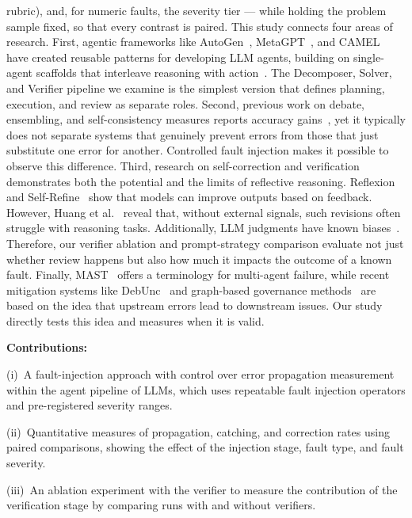 \documentclass[11pt]{article}
\begin{document}
rubric), and, for numeric faults, the severity tier --- while holding the problem sample
fixed, so that every contrast is paired.
This study connects four areas of research. First, agentic frameworks like AutoGen~\citep{wu2023autogen},
MetaGPT~\citep{hong2023metagpt}, and CAMEL~\citep{li2023camel} have created reusable patterns for
developing LLM agents, building on single-agent scaffolds that interleave reasoning with
action~\citep{yao2022react}. The Decomposer, Solver, and Verifier pipeline we examine is the
simplest version that defines planning, execution, and review as separate roles.   
Second, previous work on debate, ensembling, and self-consistency measures reports accuracy gains~\citep{du2023debate,li2024moreagents,wang2022selfconsistency}, 
yet it typically does not separate systems that genuinely prevent errors from those that just 
substitute one error for another. Controlled fault injection makes it possible to observe this 
difference.   Third, research on self-correction and verification demonstrates both the potential 
and the limits of reflective reasoning. Reflexion~\citep{shinn2023reflexion} and Self-Refine~\citep{madaan2023selfrefine} 
show that models can improve outputs based on feedback. However, Huang et al.~\citep{huang2023selfcorrect} reveal that, 
without external signals, such revisions often struggle with reasoning tasks. Additionally, 
LLM judgments have known biases~\citep{zheng2023judge}. Therefore, our verifier ablation and
prompt-strategy comparison evaluate not just whether review happens but also how much it
impacts the outcome of a known fault.   Finally, MAST~\citep{cemri2025mast} 
offers a terminology for multi-agent failure, while recent mitigation systems like DebUnc~\citep{yoffe2024debunc} and graph-based 
governance methods~\citep{xie2026spark} are based on the idea that upstream errors lead to 
downstream issues. Our study directly tests this idea and measures when it is valid.

\textbf{Contributions:}

(i)~A fault-injection approach with control over error propagation measurement within the 
agent pipeline of LLMs, which uses repeatable fault injection operators and pre-registered 
severity ranges.

(ii)~Quantitative measures of propagation, catching, and correction rates using paired 
comparisons, showing the effect of the injection stage, fault type, and fault severity.

(iii)~An ablation experiment with the verifier to measure the contribution of the verification
stage by comparing runs with and without verifiers.
\end{document}
